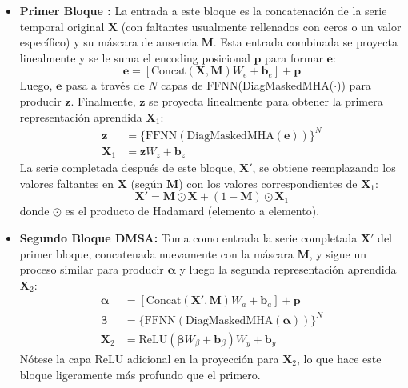 \begin{itemize}
    \item \textbf{Primer Bloque :}
    La entrada a este bloque es la concatenación de la serie temporal original $\mathbf{X}$ (con faltantes usualmente rellenados con ceros o un valor específico) y su máscara de ausencia $\mathbf{M}$. Esta entrada combinada se proyecta linealmente y se le suma el encoding posicional $\mathbf{p}$ para formar $\mathbf{e}$:
    \begin{equation}
    \mathbf{e} = [\text{Concat}(\mathbf{X}, \mathbf{M})W_e + \mathbf{b}_e] + \mathbf{p}
    \label{eq:saits_input_e}
    \end{equation}
    Luego, $\mathbf{e}$ pasa a través de $N$ capas de {FFNN(DiagMaskedMHA($\cdot$))} para producir $\mathbf{z}$. Finalmente, $\mathbf{z}$ se proyecta linealmente para obtener la primera representación aprendida $\mathbf{X}_1$:
    \begin{align}
    \mathbf{z} &= \{\text{FFNN}(\text{DiagMaskedMHA}(\mathbf{e}))\}^N \label{eq:saits_z_block1} \\
    \mathbf{X}_1 &= \mathbf{z}W_z + \mathbf{b}_z \label{eq:saits_x1}
    \end{align}
    La serie completada después de este bloque, $\mathbf{X}'$, se obtiene reemplazando los valores faltantes en $\mathbf{X}$ (según $\mathbf{M}$) con los valores correspondientes de $\mathbf{X}_1$:
    \begin{equation}
    \mathbf{X}' = \mathbf{M} \odot \mathbf{X} + (1-\mathbf{M}) \odot \mathbf{X}_1
    \label{eq:saits_x_prime}
    \end{equation}
    donde $\odot$ es el producto de Hadamard (elemento a elemento).

    \item \textbf{Segundo Bloque DMSA:}
    Toma como entrada la serie completada $\mathbf{X}'$ del primer bloque, concatenada nuevamente con la máscara $\mathbf{M}$, y sigue un proceso similar para producir $\boldsymbol{\alpha}$ y luego la segunda representación aprendida $\mathbf{X}_2$:
    \begin{align}
    \boldsymbol{\alpha} &= [\text{Concat}(\mathbf{X}', \mathbf{M})W_a + \mathbf{b}_a] + \mathbf{p} \label{eq:saits_input_alpha} \\
    \boldsymbol{\beta} &= \{\text{FFNN}(\text{DiagMaskedMHA}(\boldsymbol{\alpha}))\}^N \label{eq:saits_beta_block2} \\
    \mathbf{X}_2 &= \text{ReLU}(\boldsymbol{\beta}W_{\beta} + \mathbf{b}_{\beta})W_y + \mathbf{b}_y \label{eq:saits_x2}
    \end{align}
    Nótese la capa ReLU adicional en la proyección para $\mathbf{X}_2$, lo que hace este bloque ligeramente más profundo que el primero.


\end{itemize}
